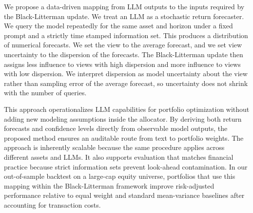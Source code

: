 We propose a data-driven mapping from LLM outputs to the inputs required by the Black-Litterman update. We treat an LLM as a stochastic return forecaster. We query the model repeatedly for the same asset and horizon under a fixed prompt and a strictly time stamped information set. This produces a distribution of numerical forecasts. We set the view to the average forecast, and we set view uncertainty to the dispersion of the forecasts. The Black-Litterman update then assigns less influence to views with high dispersion and more influence to views with low dispersion. We interpret dispersion as model uncertainty about the view rather than sampling error of the average forecast, so uncertainty does not shrink with the number of queries.

This approach operationalizes LLM capabilities for portfolio optimization without adding new modeling assumptions inside the allocator. By deriving both return forecasts and confidence levels directly from observable model outputs, the proposed method ensures an auditable route from text to portfolio weights. The approach is inherently scalable because the same procedure applies across different assets and LLMs. It also supports evaluation that matches financial practice because strict information sets prevent look-ahead contamination. In our out-of-sample backtest on a large-cap equity universe, portfolios that use this mapping within the Black-Litterman framework improve risk-adjusted performance relative to equal weight and standard mean-variance baselines after accounting for transaction costs.

